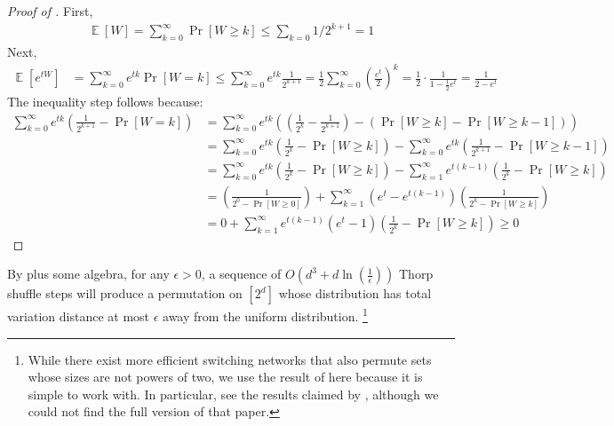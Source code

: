 \documentclass[10pt]{article}
\theoremstyle{definition}\newtheorem{definition}[lemma]{Definition}
\theoremstyle{remark}  \newtheorem*{remark}{Remark}
\DeclareMathOperator{\EE}{\mathbb{E}}
\begin{document}
\begin{proof}[Proof of ]
  First,
  \begin{align*}
    \EE[W] = \sum_{k=0}^{\infty} \Pr[W \ge k] \le \sum_{k=0} 1/2^{k + 1} = 1
  \end{align*}
  Next,
  \begin{align*}
    \EE[e^{t W}] &= \sum_{k=0}^{\infty} e^{t k} \Pr[W = k] \le \sum_{k=0}^{\infty} e^{t k} \frac{1}{2^{k+1}} = \frac{1}{2} \sum_{k=0}^{\infty} \left(\frac{e^t}{2}\right)^k = \frac{1}{2}\cdot\frac{1}{1 - \frac{1}{2}e^t} = \frac{1}{2 - e^t}
  \end{align*}
  The inequality step follows because:
  \begin{align*}
     \sum_{k=0}^{\infty} e^{t k} \left(\frac{1}{2^{k+1}} - \Pr[W = k]\right)
        &= \sum_{k=0}^{\infty} e^{t k} \left((\frac{1}{2^{k}} - \frac{1}{2^{k+1}}) -(\Pr[W \ge k] - \Pr[W \ge k - 1])\right) \\
        &= \sum_{k=0}^{\infty} e^{t k} \left(\frac{1}{2^{k}} - \Pr[W \ge k]\right)
          - \sum_{k=0}^{\infty} e^{t k} \left(\frac{1}{2^{k + 1}} - \Pr[W \ge k - 1]\right) \\
        &= \sum_{k=0}^{\infty} e^{t k} \left(\frac{1}{2^{k}} - \Pr[W \ge k]\right)
          - \sum_{k=1}^{\infty} e^{t (k - 1)} \left(\frac{1}{2^{k}} - \Pr[W \ge k]\right) \\
        &= \left(\frac{1}{2^{0} - \Pr[W \ge 0]}\right) + \sum_{k=1}^{\infty} (e^t - e^{t (k - 1)}) \left( \frac{1}{2^{k} - \Pr[W \ge k]}\right) \\
        &= 0 + \sum_{k=1}^{\infty} e^{t (k -1)}(e^t - 1) \left(\frac{1}{2^{k}} - \Pr[W \ge k]\right) \ge 0
  \end{align*}
\end{proof}

By \cite{Morris13} plus some algebra, for any $\epsilon > 0$, a sequence of $O\left(d^3 + d \ln(\frac{1}{\epsilon}) \right)$ Thorp shuffle steps will produce a permutation on $[2^d]$ whose distribution has total variation distance at most $\epsilon$ away from the uniform distribution. %
\footnote{While there exist more efficient switching networks that also permute sets whose sizes are not powers of two, we use the result of \cite{Morris13} here because it is simple to work with. In particular, see the results claimed by \cite{Czumaj15}, although we could not find the full version of that paper.}
\end{document}
